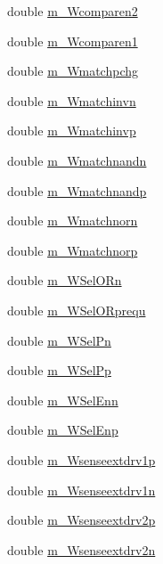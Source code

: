 \begin{DoxyCompactItemize}
\item 
double \hyperlink{classTechParameter_ae203b87c31ffc0dc4c3fc9d0dfd08201}{m\_\-Wcomparen2}
\item 
double \hyperlink{classTechParameter_a213cb251ab2b3b875c0efe511139605d}{m\_\-Wcomparen1}
\item 
double \hyperlink{classTechParameter_a827b2c8dd9f86b01ac3fe4b8b8eab300}{m\_\-Wmatchpchg}
\item 
double \hyperlink{classTechParameter_a9ed4a0644238eeb49bc4d814b393406e}{m\_\-Wmatchinvn}
\item 
double \hyperlink{classTechParameter_aaa616feedb2fda32d68e0d8d97e9e9c6}{m\_\-Wmatchinvp}
\item 
double \hyperlink{classTechParameter_ad4bff36035c36a16cd8bfc9662c19f41}{m\_\-Wmatchnandn}
\item 
double \hyperlink{classTechParameter_a66e9200fb753ccfdb9ec758cc3e738ab}{m\_\-Wmatchnandp}
\item 
double \hyperlink{classTechParameter_ae21ec76b63f84f71c61831dea6731c63}{m\_\-Wmatchnorn}
\item 
double \hyperlink{classTechParameter_a6f418598d6134b72cfe8dea6253db200}{m\_\-Wmatchnorp}
\item 
double \hyperlink{classTechParameter_afccc25699d6fbd81b887667be7dd7792}{m\_\-WSelORn}
\item 
double \hyperlink{classTechParameter_af279dfc6213225bac95bcf337c569f8a}{m\_\-WSelORprequ}
\item 
double \hyperlink{classTechParameter_a9f7518a56db0045161f4d9596eea6581}{m\_\-WSelPn}
\item 
double \hyperlink{classTechParameter_ac2adf2c81ca9941341c4582c43d400ca}{m\_\-WSelPp}
\item 
double \hyperlink{classTechParameter_af531d60a8bd728082a47f6653b72735e}{m\_\-WSelEnn}
\item 
double \hyperlink{classTechParameter_abf00d263379d15abcbaeb265da7ffa5f}{m\_\-WSelEnp}
\item 
double \hyperlink{classTechParameter_a13705ba7b89d4255ab4fc702ef3ed709}{m\_\-Wsenseextdrv1p}
\item 
double \hyperlink{classTechParameter_afa92ad9cefcd476df221914642bd2962}{m\_\-Wsenseextdrv1n}
\item 
double \hyperlink{classTechParameter_a229e499fac1face8aea907a26ed74d9a}{m\_\-Wsenseextdrv2p}
\item 
double \hyperlink{classTechParameter_aef6ad54e791f509d34749a3c7f18bac6}{m\_\-Wsenseextdrv2n}
\item 

\end{DoxyCompactItemize}
